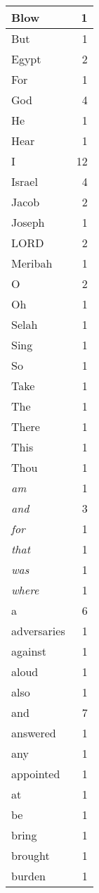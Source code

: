\begin{center}
\begin{longtable}{l|r}
\hline \hline
\endlastfoot
Blow & 1 \\ \hline
But & 1 \\ \hline
Egypt & 2 \\ \hline
For & 1 \\ \hline
God & 4 \\ \hline
He & 1 \\ \hline
Hear & 1 \\ \hline
I & 12 \\ \hline
Israel & 4 \\ \hline
Jacob & 2 \\ \hline
Joseph & 1 \\ \hline
LORD & 2 \\ \hline
Meribah & 1 \\ \hline
O & 2 \\ \hline
Oh & 1 \\ \hline
Selah & 1 \\ \hline
Sing & 1 \\ \hline
So & 1 \\ \hline
Take & 1 \\ \hline
The & 1 \\ \hline
There & 1 \\ \hline
This & 1 \\ \hline
Thou & 1 \\ \hline
\emph{am} & 1 \\ \hline
\emph{and} & 3 \\ \hline
\emph{for} & 1 \\ \hline
\emph{that} & 1 \\ \hline
\emph{was} & 1 \\ \hline
\emph{where} & 1 \\ \hline
a & 6 \\ \hline
adversaries & 1 \\ \hline
against & 1 \\ \hline
aloud & 1 \\ \hline
also & 1 \\ \hline
and & 7 \\ \hline
answered & 1 \\ \hline
any & 1 \\ \hline
appointed & 1 \\ \hline
at & 1 \\ \hline
be & 1 \\ \hline
bring & 1 \\ \hline
brought & 1 \\ \hline
burden & 1 \\ \hline

\end{longtable}
\end{center}
